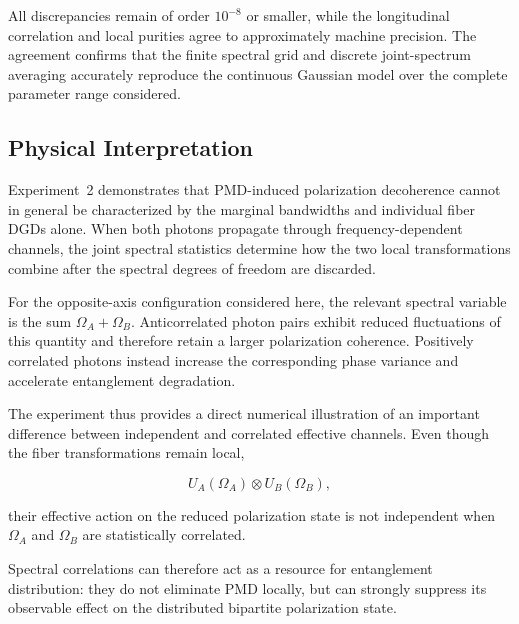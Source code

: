 All discrepancies remain of order \(10^{-8}\) or smaller, while the longitudinal
correlation and local purities agree to approximately machine precision. The
agreement confirms that the finite spectral grid and discrete joint-spectrum
averaging accurately reproduce the continuous Gaussian model over the complete
parameter range considered.


\subsection{Physical Interpretation}

Experiment~2 demonstrates that PMD-induced polarization decoherence cannot in
general be characterized by the marginal bandwidths and individual fiber DGDs
alone. When both photons propagate through frequency-dependent channels, the
joint spectral statistics determine how the two local transformations combine after
the spectral degrees of freedom are discarded.

For the opposite-axis configuration considered here, the relevant spectral variable is
the sum \(\Omega_A+\Omega_B\). Anticorrelated photon pairs exhibit reduced
fluctuations of this quantity and therefore retain a larger polarization coherence.
Positively correlated photons instead increase the corresponding phase variance and
accelerate entanglement degradation.

The experiment thus provides a direct numerical illustration of an important
difference between independent and correlated effective channels. Even though the
fiber transformations remain local,

\begin{equation}
U_A(\Omega_A)\otimes U_B(\Omega_B),
\end{equation}

their effective action on the reduced polarization state is not independent when
\(\Omega_A\) and \(\Omega_B\) are statistically correlated.

Spectral correlations can therefore act as a resource for entanglement distribution:
they do not eliminate PMD locally, but can strongly suppress its observable effect on
the distributed bipartite polarization state.
